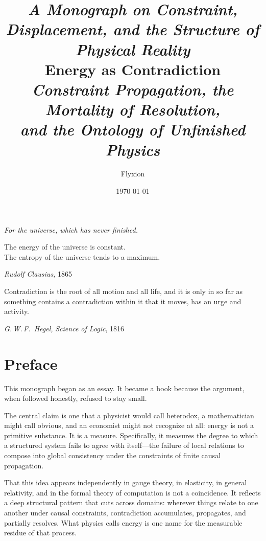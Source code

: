 \documentclass[12pt,a4paper,openany]{book}
\title{%
  {\Large\itshape A Monograph on Constraint, Displacement, and the Structure of Physical Reality}\\[1.5ex]
  {\Huge\bfseries Energy as Contradiction}\\[1ex]
  {\large\itshape Constraint Propagation, the Mortality of Resolution,\\
  and the Ontology of Unfinished Physics}
}
\author{Flyxion}
\date{\today}
\theoremstyle{plain}
\theoremstyle{definition}
\theoremstyle{remark}
\begin{document}

\frontmatter

\maketitle

\thispagestyle{empty}
\vspace*{\fill}
\begin{center}
\textit{For the universe, which has never finished.}
\end{center}
\vspace*{\fill}
\clearpage

\thispagestyle{empty}
\vspace*{4cm}
\epigraph{%
  The energy of the universe is constant.\\
  The entropy of the universe tends to a maximum.
}{%
  \textit{Rudolf Clausius,} 1865
}
\vspace{2cm}
\epigraph{%
  Contradiction is the root of all motion and all life,
  and it is only in so far as something contains a contradiction
  within it that it moves, has an urge and activity.
}{%
  \textit{G.\,W.\,F.~Hegel,} \textit{Science of Logic}, 1816
}
\clearpage

\chapter*{Preface}

This monograph began as an essay. It became a book because the argument, when followed honestly, refused to stay small.

The central claim is one that a physicist would call heterodox, a mathematician might call obvious, and an economist might not recognize at all: energy is not a primitive substance. It is a measure. Specifically, it measures the degree to which a structured system fails to agree with itself---the failure of local relations to compose into global consistency under the constraints of finite causal propagation.

That this idea appears independently in gauge theory, in elasticity, in general relativity, and in the formal theory of computation is not a coincidence. It reflects a deep structural pattern that cuts across domains: wherever things relate to one another under causal constraints, contradiction accumulates, propagates, and partially resolves. What physics calls energy is one name for the measurable residue of that process.
\end{document}
